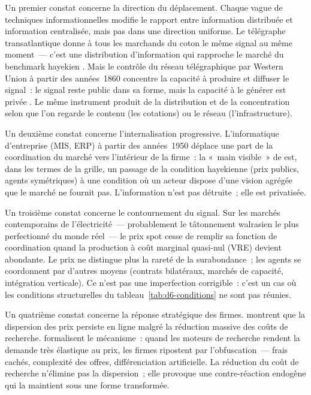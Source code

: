 Un premier constat concerne la direction du déplacement. Chaque vague de techniques informationnelles modifie le rapport entre information distribuée et information centralisée, mais pas dans une direction uniforme. Le télégraphe transatlantique donne à tous les marchands du coton le même signal au même moment~--- c'est une distribution d'information qui rapproche le marché du benchmark hayekien \parencite{steinwender_real_2018}. Mais le contrôle du réseau télégraphique par Western Union à partir des années~1860 concentre la capacité à produire et diffuser le signal~: le signal reste public dans sa forme, mais la capacité à le générer est privée \parencite{wu2010master}. Le même instrument produit de la distribution et de la concentration selon que l'on regarde le contenu (les cotations) ou le réseau (l'infrastructure).

Un deuxième constat concerne l'internalisation progressive. L'informatique d'entreprise (MIS, ERP) à partir des années~1950 déplace une part de la coordination du marché vers l'intérieur de la firme~: la «~main visible~» de \textcite{chandler_visible_1977} est, dans les termes de la grille, un passage de la condition hayekienne (prix publics, agents symétriques) à une condition où un acteur dispose d'une vision agrégée que le marché ne fournit pas. L'information n'est pas détruite~; elle est privatisée.

Un troisième constat concerne le contournement du signal. Sur les marchés contemporains de l'électricité~--- probablement le tâtonnement walrasien le plus perfectionné du monde réel~--- le prix spot cesse de remplir sa fonction de coordination quand la production à coût marginal quasi-nul (VRE) devient abondante. Le prix ne distingue plus la rareté de la surabondance~; les agents se coordonnent par d'autres moyens (contrats bilatéraux, marchés de capacité, intégration verticale). Ce n'est pas une imperfection corrigible~: c'est un cas où les conditions structurelles du tableau~\ref{tab:d6-conditions} ne sont pas réunies.

Un quatrième constat concerne la réponse stratégique des firmes. \textcite{brynjolfsson_smith_2000} montrent que la dispersion des prix persiste en ligne malgré la réduction massive des coûts de recherche. \textcite{ellison_search_2009} formalisent le mécanisme~: quand les moteurs de recherche rendent la demande très élastique au prix, les firmes ripostent par l'obfuscation~--- frais cachés, complexité des offres, différenciation artificielle. La réduction du coût de recherche n'élimine pas la dispersion~; elle provoque une contre-réaction endogène qui la maintient sous une forme transformée.

